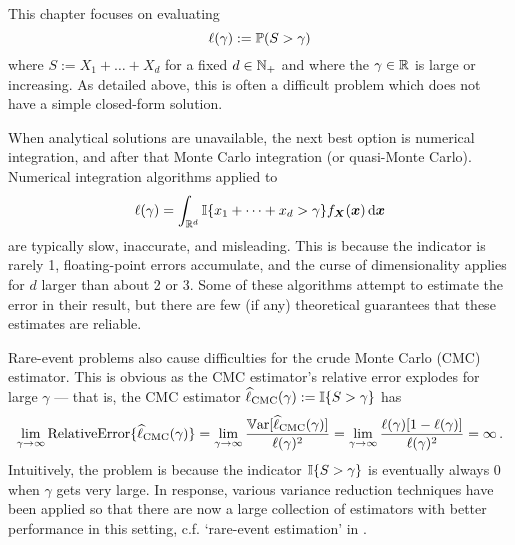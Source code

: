 
This chapter focuses on evaluating
\begin{equation} \label{ProbabilityOfInterest}
\ell(\gamma) := \operatorname{{\mathbb P}}(S > \gamma)
\end{equation}
where $S := X_1 + \dots + X_d$ for a fixed $d \in \mathbb{N}_+$ and where the $\gamma \in \mathbb{R}$ is large or increasing. As detailed above, this is often a difficult problem which does not have a simple closed-form solution.

When analytical solutions are unavailable, the next best option is numerical integration, and after that Monte Carlo integration (or quasi-Monte Carlo).
Numerical integration algorithms applied to
\[ \ell(\gamma) = \int_{\mathbb{R}^d} \mathbb{I}\{  x_1 + \dots + x_d > \gamma \} f_{\bm{X}}(\bm{x}) \mathop{}\!\mathrm{d} \bm{x} \]
are typically slow, inaccurate, and misleading. This is because the indicator is rarely 1, floating-point errors accumulate, and the curse of dimensionality applies for $d$ larger than about 2 or 3. Some of these algorithms attempt to estimate the error in their result, but there are few (if any) theoretical guarantees that these estimates are reliable.

Rare-event problems also cause difficulties for the crude Monte Carlo (CMC) estimator. This is obvious as the CMC estimator's relative error explodes for large $\gamma$ --- that is, the CMC estimator $\widehat{\ell}_{\text{CMC}}(\gamma) := \mathbb{I}\{ S > \gamma \}$ has
\[ \lim_{\gamma \to \infty} \text{RelativeError}\{ \widehat{\ell}_{\text{CMC}}(\gamma) \} = \lim_{\gamma \to \infty} \frac{ \operatorname{\mathbb{V}\mathrm{ar}}[ \widehat{\ell}_{\text{CMC}}(\gamma) ] }{ \ell(\gamma)^2 } = \lim_{\gamma \to \infty} \frac{  \ell(\gamma)[1-\ell(\gamma)] }{  \ell(\gamma)^2 } = \infty \,. \]
Intuitively, the problem is because the indicator $\mathbb{I}\{ S > \gamma \}$ is eventually always 0 when $\gamma$ gets very large. In response, various variance reduction techniques have been applied so that there are now a large collection of estimators with better performance in this setting, c.f. `rare-event estimation' in \cite{kroese2013handbook,asmussen2007stochastic,glasserman2003monte}.

